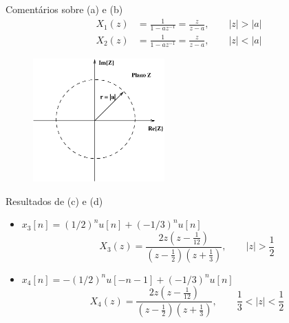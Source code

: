 \begin{slide}{Comentários sobre (a) e (b)}
   \begin{align*}
          X_1(z) &= \frac{1}{1-az^{-1}} = \frac{z}{z-a}, \qquad |z|>|a|\\
          X_2(z) &= \frac{1}{1-az^{-1}} = \frac{z}{z-a}, \qquad |z|<|a|
      \end{align*}
    \begin{figure}
      \centering
      \includegraphics[width=0.45\textwidth]{figs/ex0102.eps}
   \end{figure}
\end{slide}

 \begin{slide}{Resultados de (c) e (d)}
   \begin{itemize}
      \item $x_3[n] = (1/2)^nu[n]+(-1/3)^nu[n]$
      \begin{equation*}
          X_3(z) = \frac{2z\left ( z - \frac{1}{12} \right )}{\left ( z-\frac{1}{2}\right )\left ( z+\frac{1}{3}\right )}, \qquad |z| > \frac{1}{2}
      \end{equation*}
      \pause
      \item $x_4[n] = -(1/2)^nu[-n-1]+(-1/3)^nu[n]$
      \begin{equation*}
          X_4(z) = \frac{2z\left ( z - \frac{1}{12} \right )}{\left ( z-\frac{1}{2}\right )\left ( z+\frac{1}{3}\right )}, \qquad \frac{1}{3} < |z| < \frac{1}{2}
      \end{equation*}
   \end{itemize}
\end{slide}

